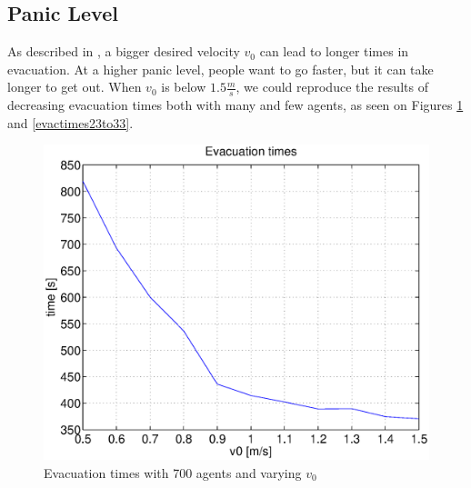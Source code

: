 \documentclass[11pt]{article}
\begin{document}

\FloatBarrier %
\subsection{Panic Level} %
\label{sub:paniclevel}
As described in \cite{helbing}, a bigger desired velocity \(v_0\) 
can lead to longer times in evacuation.
At a higher panic level, people want to go faster, but it can take longer to get out.
When \(v_0\) is below \(1.5\frac{m}{s}\), we could reproduce the results of decreasing evacuation times
both with many and few agents, as seen on Figures \ref{evactimes1to11} and \ref{evactimes23to33}.

\begin{figure}[h]
	\centering
	\includegraphics[scale=0.5]{images/evactimes1to11.eps}
	\caption{Evacuation times with 700 agents and varying \(v_0\) 	}
	\label{evactimes1to11}
\end{figure}
\end{document}
